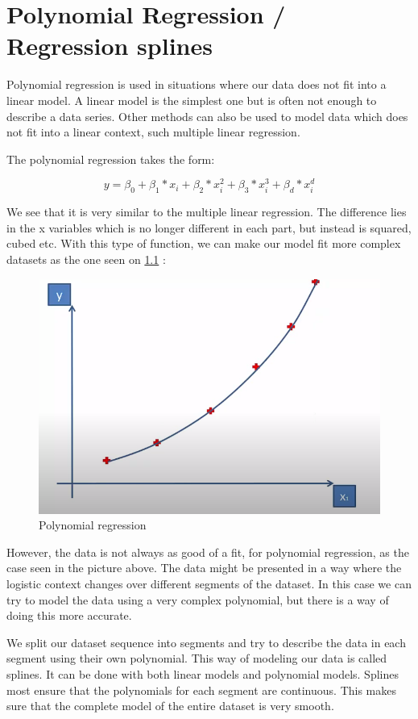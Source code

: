 
\chapter{Polynomial Regression / Regression splines}

Polynomial regression is used in situations where our data does not fit into a linear model. A linear model is the simplest one but is often not enough to describe a data series. Other methods can also be used to model data which does not fit into a linear context, such multiple linear regression. 

The polynomial regression takes the form:

\begin{equation} \label{eq:2}
y = \beta_0 + \beta_1 * x_i + \beta_2 * x_i^2 + \beta_3 * x_i^3 + \beta_d * x_i^d  
\end{equation}

We see that it is very similar to the multiple linear regression. The difference lies in the x variables which is no longer different in each part, but instead is squared, cubed etc. With this type of function, we can make our model fit more complex datasets as the one seen on \ref{fig:poly_reg} :

\begin{figure}[H]
	\centering
	\includegraphics[width=\textwidth]{Img/poly_reg.PNG}
	\caption{Polynomial regression}
	\label{fig:poly_reg}
\end{figure} 

However, the data is not always as good of a fit, for polynomial regression, as the case seen in the picture above. The data might be presented in a way where the logistic context changes over different segments of the dataset. In this case we can try to model the data using a very complex polynomial, but there is a way of doing this more accurate. 

We split our dataset sequence into segments and try to describe the data in each segment using their own polynomial. This way of modeling our data is called splines. It can be done with both linear models and polynomial models. Splines most ensure that the polynomials for each segment are continuous. This makes sure that the complete model of the entire dataset is very smooth. 
